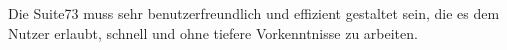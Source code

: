 Die Suite73 muss sehr benutzerfreundlich und effizient gestaltet sein, die es dem Nutzer erlaubt, schnell und ohne tiefere Vorkenntnisse zu arbeiten.  